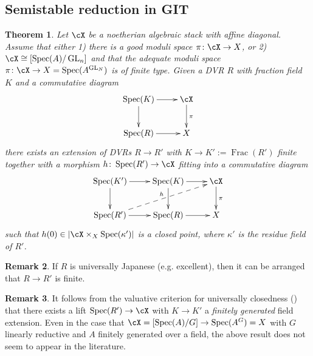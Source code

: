 \documentclass[a4paper]{amsart}
\numberwithin{equation}{section}
\theoremstyle{plain}
\newtheorem{thm}{Theorem}[section]
\theoremstyle{definition}
\newtheorem{remark}[thm]{Remark}
\DeclareMathOperator{\Spec}{Spec}
\DeclareMathOperator{\GL}{GL}
\DeclareMathOperator{\Frac}{Frac}
\newcommand{\co}{\colon}
\begin{document}
\subsection{Semistable reduction in GIT}

\begin{thm} \label{T:valuative-criterion-finite}
Let $\cX$ be a noetherian algebraic stack with affine diagonal.  Assume that either 1) there is a good moduli space $\pi \co \cX \to X$, or 2) $\cX \cong [\Spec(A)/\GL_n]$ and that the adequate moduli space $\pi \co \cX \to X = \Spec(A^{\GL_N})$ is of finite type.  Given a DVR $R$ with fraction field $K$ and a commutative diagram
$$\xymatrix{
\Spec(K) \ar[r] \ar[d]		& \cX \ar[d]^{\pi} \\
\Spec(R) \ar[r]			& X
}$$
there exists an extension of DVRs $R \to R'$ with $K \to K':=\Frac(R')$ finite together with a morphism $h \co \Spec(R') \to \cX$ fitting into a commutative diagram
$$\xymatrix{
\Spec(K') \ar[r] \ar[d]	& \Spec(K) \ar[r] \ar[d]		& \cX \ar[d]^{\pi} \\
\Spec(R') \ar[r]  \ar@{-->}[urr]^h		& \Spec(R) \ar[r]			& X
}$$
such that $h(0) \in | \cX \times_X \Spec(\kappa')|$ is a closed point, where $\kappa'$ is the residue field of $R'$.
\end{thm}

\begin{remark} If $R$ is universally Japanese (e.g. excellent), then it can be arranged that $R \to R'$ is finite.
\end{remark}

\begin{remark} It follows from the valuative criterion for universally closedness (\cite[Thm.~7.3]{lmb}) that there exists a lift $\Spec(R') \to \cX$ with $K \to K'$ a {\it finitely generated} field extension.  Even in the case that $\cX=[\Spec(A)/G] \to \Spec(A^G) = X$ with $G$ linearly reductive and $A$ finitely generated over a field, the above result does not seem to appear in the literature. 
\end{remark}
\end{document}
